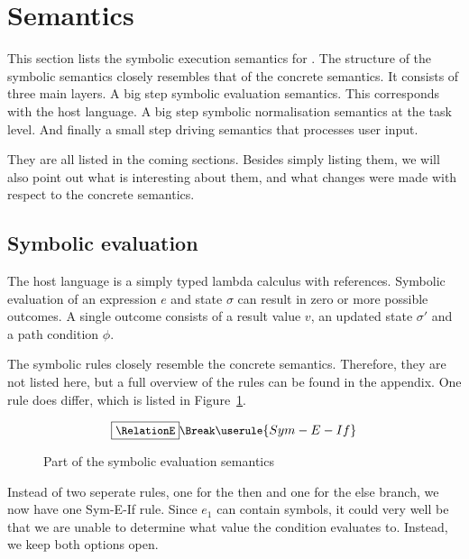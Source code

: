 

\section{Semantics}
\label{sec:semantics}

This section lists the symbolic execution semantics for \TOPHAT.
The structure of the symbolic semantics closely resembles that of the concrete semantics.
It consists of three main layers.
A big step symbolic evaluation semantics.
This corresponds with the host language.
A big step symbolic normalisation semantics at the task level.
And finally a small step driving semantics that processes user input.

They are all listed in the coming sections.
Besides simply listing them, we will also point out what is interesting about them,
and what changes were made with respect to the concrete semantics.

\subsection{Symbolic evaluation}

The host language is a simply typed lambda calculus with references.
Symbolic evaluation of an expression $e$ and state $\sigma$ can result in zero or more possible outcomes.
A single outcome consists of a result value $v$, an updated state $\sigma'$ and a path condition $\phi$.


The symbolic rules closely resemble the concrete semantics.
Therefore, they are not listed here, but a full overview of the rules can be found in the appendix.
One rule does differ, which is listed in Figure~\ref{fig:eval}.

\begin{figure}[h]
\begin{gather*}
  \small
  \boxed{\RelationE} \Break
  \userule{Sym-E-If}
\end{gather*}
\caption{Part of the symbolic evaluation semantics}
\label{fig:eval}
\end{figure}

Instead of two seperate rules, one for the then and one for the else branch, we now have one Sym-E-If rule.
Since $e_1$ can contain symbols, it could very well be that we are unable to determine what value the condition evaluates to.
Instead, we keep both options open.

